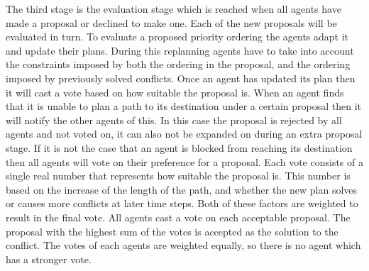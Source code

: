 The third stage is the evaluation stage which is reached when all agents have
made a proposal or declined to make one. Each of the new proposals will be
evaluated in turn. To evaluate a proposed priority ordering the agents adapt it
and update their plans. During this replanning agents have to take into account
the constraints imposed by both the ordering in the proposal, and the ordering
imposed by previously solved conflicts. Once an agent has updated its plan then
it will cast a vote based on how suitable the proposal is. When an agent finds
that it is unable to plan a path to its destination under a certain proposal
then it will notify the other agents of this. In this case the proposal is
rejected by all agents and not voted on, it can also not be expanded on during
an extra proposal stage. If it is not the case that an agent is blocked from
reaching its destination then all agents will vote on their preference for a
proposal. Each vote consists of a single real number that represents how
suitable the proposal is. This number is based on the increase of the length of
the path, and whether the new plan solves or causes more conflicts at later
time steps. Both of these factors are weighted to result in the final vote. All
agents cast a vote on each acceptable proposal. The proposal with the highest
sum of the votes is accepted as the solution to the conflict. The votes of each
agents are weighted equally, so there is no agent which has a stronger vote.


